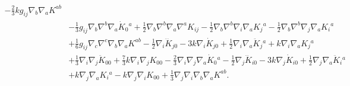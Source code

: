 \documentclass[10pt,letterpaper]{article}
\numberwithin{equation}{subsection}
\begin{document}
\begin{align}
 -  \tfrac{2}{3} k g_{ij} \nabla_{b}\nabla_{a}K^{ab}\nonumber\\
& -  \tfrac{1}{3} g_{ij} \nabla_{b}\nabla^{b}\nabla_{a}\dot{K}_{0}{}^{a}
 + \tfrac{1}{2} \nabla_{b}\nabla^{b}\nabla_{a}\nabla^{a}K_{ij}
 -  \tfrac{1}{2} \nabla_{b}\nabla^{b}\nabla_{i}\nabla_{a}K_{j}{}^{a}
 -  \tfrac{1}{2} \nabla_{b}\nabla^{b}\nabla_{j}\nabla_{a}K_{i}{}^{a}\nonumber\\
& + \tfrac{1}{6} g_{ij} \nabla_{c}\nabla^{c}\nabla_{b}\nabla_{a}K^{ab}
 -  \tfrac{1}{2} \nabla_{i}\dddot{K}_{j0}
 - 3 k \nabla_{i}\dot{K}_{j0}
 + \tfrac{1}{2} \nabla_{i}\nabla_{a}\ddot{K}_{j}{}^{a}
 + k \nabla_{i}\nabla_{a}K_{j}{}^{a}\nonumber\\
& + \tfrac{1}{3} \nabla_{i}\nabla_{j}\ddot{K}_{00}
 + \tfrac{7}{3} k \nabla_{i}\nabla_{j}K_{00}
 -  \tfrac{2}{3} \nabla_{i}\nabla_{j}\nabla_{a}\dot{K}_{0}{}^{a}
 -  \tfrac{1}{2} \nabla_{j}\dddot{K}_{i0}
 - 3 k \nabla_{j}\dot{K}_{i0}
 + \tfrac{1}{2} \nabla_{j}\nabla_{a}\ddot{K}_{i}{}^{a}\nonumber\\
& + k \nabla_{j}\nabla_{a}K_{i}{}^{a}
 -  k \nabla_{j}\nabla_{i}K_{00}
 + \tfrac{1}{3} \nabla_{j}\nabla_{i}\nabla_{b}\nabla_{a}K^{ab}.
\end{align}
\end{document}
